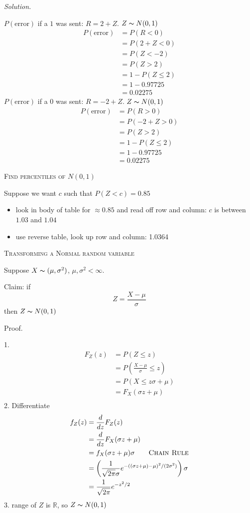 
\emph{Solution.}

$ P(\text{error}) $ if a $ 1 $ was sent: $ R =2+Z $. $ Z \thicksim N(0,1) $
\begin{align*}
    P(\text{error})&=P(R<0)\\
    &=P(2+Z<0)\\
    &=P(Z<-2)\\
    &=P(Z>2)\\
    &=1-P(Z\le 2)\\
    &=1-0.97725\\
    &=0.02275
\end{align*}
$ P(\text{error}) $ if a $ 0 $ was sent: $ R=-2+Z $. $ Z \thicksim N(0,1) $
\begin{align*}
    P(\text{error})&=P(R>0)\\
    &=P(-2+Z>0)\\
    &=P(Z>2)\\
    &=1-P(Z\le 2)\\
    &=1-0.97725\\
    &=0.02275
\end{align*}

\textsc{Find percentiles of $ N(0,1) $}

Suppose we want $ c $ such that $ P(Z<c)=0.85 $
\begin{itemize}
    \item look in body of table for $ \approx 0.85 $ and read off row and column: $ c $ is between $ 1.03 $ and $ 1.04 $
    \item use reverse table, look up row and column: 1.0364
\end{itemize}

\textsc{Transforming a Normal random variable}

Suppose $ X \thicksim (\mu,\sigma^2) $, $ \mu,\sigma^2<\infty $.

Claim: if
\[ Z=\frac{X-\mu}{\sigma}  \]
then $ Z \thicksim N(0,1) $

Proof.

1.
\begin{align*}
    F_Z(z)&=P(Z\le z)\\
    &=P\left(\frac{X-\mu}{\sigma}\le z\right)\\
    &=P\left(X\le z\sigma + \mu\right)\\
    &=F_X(\sigma z+\mu)\\
\end{align*}
2. Differentiate
\begin{align*}
    f_Z(z)&=\frac{d}{dz}F_Z(z)\\
    &=\frac{d}{dz}F_X(\sigma z+\mu)\\
    &=f_X(\sigma z+\mu)\sigma \qquad \textsc{Chain Rule}\\
    &=\left(\frac{1}{\sqrt{2\pi}\sigma}e^{-((\sigma z+\mu)-\mu)^2/(2\sigma^2)}\right)\sigma\\
    &=\frac{1}{\sqrt{2\pi}}e^{-z^2/2}
\end{align*}
3. range of $ Z $ is $ \mathbb{R} $, so $ Z \thicksim N(0,1) $

